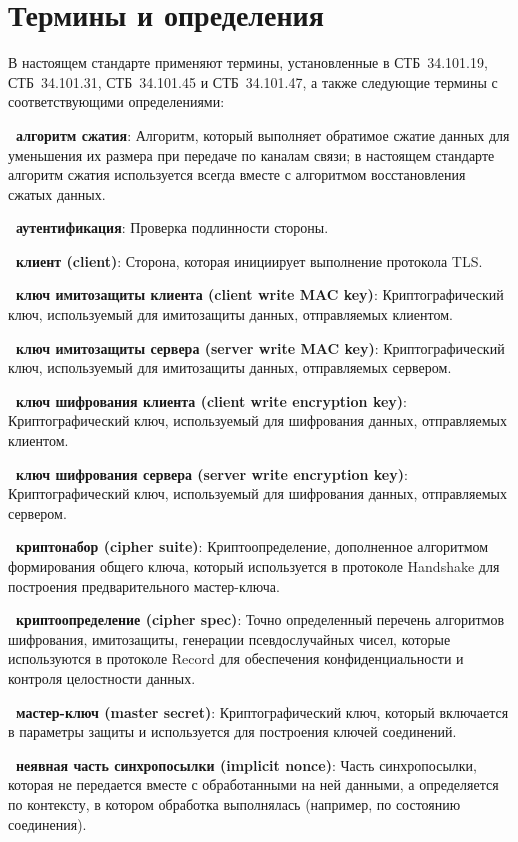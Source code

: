 \chapter{Термины и определения}\label{TERMS}

В настоящем стандарте применяют термины, установленные в СТБ~34.101.19, 
СТБ~34.101.31, СТБ~34.101.45 и СТБ~34.101.47, а также следующие термины с 
соответствующими определениями: 

{\bf \thedefctr~алгоритм сжатия}:
Алгоритм, который выполняет обратимое сжатие данных для уменьшения их 
размера при передаче по каналам связи; в настоящем стандарте алгоритм 
сжатия используется всегда вместе с алгоритмом восстановления сжатых 
данных. 

{\bf \thedefctr~аутентификация}:
Проверка подлинности стороны.

{\bf \thedefctr~клиент (client)}:
Сторона, которая инициирует выполнение протокола TLS.

{\bf \thedefctr~ключ имитозащиты клиента (client write MAC key)}:
Криптографический ключ, используемый для имитозащиты данных, отправляемых 
клиентом. 

{\bf \thedefctr~ключ имитозащиты сервера (server write MAC key)}:
Криптографический ключ, используемый для имитозащиты данных, отправляемых 
сервером. 

{\bf \thedefctr~ключ шифрования клиента (client write encryption key)}:
Криптографический ключ, используемый для шифрования данных, отправляемых 
клиентом. 

{\bf \thedefctr~ключ шифрования сервера (server write encryption key)}:
Криптографический ключ, используемый для шифрования данных, отправляемых 
сервером. 

{\bf \thedefctr~криптонабор (cipher suite)}:
Криптоопределение, дополненное алгоритмом формирования общего ключа, 
который используется в протоколе Handshake для построения предварительного 
мастер-ключа. 

{\bf \thedefctr~криптоопределение (cipher spec)}:
Точно определенный перечень алгоритмов шифрования, имитозащиты, генерации 
псевдослучайных чисел, которые используются в протоколе Record для 
обеспечения конфиденциальности и контроля целостности данных. 

{\bf \thedefctr~мастер-ключ (master secret)}:
Криптографический ключ, который включается в параметры защиты и 
используется для построения ключей соединений. 

{\bf \thedefctr~неявная часть синхропосылки (implicit nonce)}:
Часть синхропосылки, которая не передается вместе с обработанными на ней 
данными, а определяется по контексту, в котором обработка выполнялась 
(например, по состоянию соединения). 

